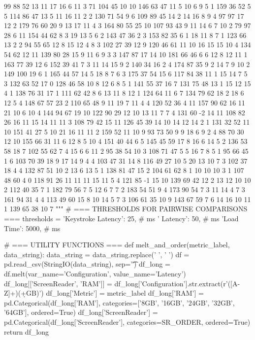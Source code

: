 \begin{pyverbatim}
{	99	88	52	13	11	17	16	6	11	3	71	104	45	10	10
	146	63	47	11	5	10	6	9	5	1	159	36	52	5	5
	114	86	47	13	5	11	16	11	2	2	130	71	54	9	6
	109	89	45	14	2	14	16	8	9	4	97	97	17	12	2
	179	76	60	20	9	13	17	11	4	3	164	80	55	25	10
	107	93	43	9	11	14	6	7	10	2	79	97	28	6	11
	154	44	62	8	3	19	13	5	6	2	143	47	36	2	3
	153	82	35	6	1	18	11	8	7	1	123	66	13	2	2
	94	55	65	12	8	15	12	4	8	3	102	27	39	12	9
	120	46	61	11	10	16	15	15	10	4	134	54	62	12	11
	139	80	28	15	9	11	6	9	3	3	147	87	17	14	10
	181	66	46	6	6	12	8	12	11	1	163	77	39	12	6
	152	39	41	7	3	11	14	15	9	2	140	34	16	2	4
	174	87	35	9	2	14	7	9	10	2	149	100	19	6	1
	165	44	57	14	5	18	8	7	6	3	175	37	54	15	6
	117	84	38	11	1	15	14	7	5	3	132	63	52	17	0
	128	46	58	10	8	12	6	8	5	1	141	55	37	16	7
	131	75	48	13	1	15	12	15	4	1	138	76	31	17	1
	111	62	42	8	6	13	11	8	12	1	124	64	11	6	7
	134	79	62	18	2	18	6	12	5	4	148	67	57	23	2
	110	65	48	9	11	19	7	11	4	4	120	52	36	4	11
	157	90	62	16	11	21	10	6	10	4	144	94	67	19	10
	122	90	29	12	10	13	11	7	7	4	131	60	-2	14	11
	108	82	26	16	11	15	14	11	11	3	108	79	42	15	11
	126	45	39	14	10	14	12	14	2	1	131	32	52	11	10
	151	41	27	5	10	21	16	11	11	2	159	52	11	10	9
	93	73	50	9	9	18	6	9	2	4	88	70	30	12	10
	155	66	31	11	6	12	8	5	10	4	151	40	44	6	5
	145	45	59	17	8	16	6	14	5	2	136	53	58	18	7
	102	55	62	7	4	15	6	6	11	2	95	38	54	10	3
	108	71	47	5	5	16	7	8	5	1	95	66	45	1	6
	103	70	39	18	9	17	14	9	4	4	103	47	31	14	8
	116	49	27	10	5	20	13	10	7	3	102	37	18	4	4
	132	87	51	10	2	13	6	13	5	1	138	81	47	15	2
	104	61	62	8	1	10	10	10	3	1	107	48	60	4	0
	118	91	26	11	11	11	15	11	5	4	121	85	-1	15	10
	139	69	42	12	2	13	12	10	10	2	112	40	35	7	1
	182	79	56	7	5	12	6	7	7	2	183	54	51	9	4
	173	90	54	7	3	11	14	4	7	3	161	94	31	4	4
	113	49	60	15	8	10	14	5	7	3	106	61	35	10	9
	143	67	59	7	6	14	16	10	11	1	139	65	38	10	7
	"""
	}
	# === THRESHOLDS FOR PAIRWISE COMPARISONS ===
	thresholds = {
	'Keystroke Latency': 25,  # ms
	' Latency': 50,  # ms
	'Load Time': 5000,  # ms
	}

	# === UTILITY FUNCTIONS ===
	def melt_and_order(metric_label, data_string):
	data_string = data_string.replace(' ', ' ')
	df = pd.read_csv(StringIO(data_string), sep='\t')
	df_long = df.melt(var_name='Configuration', value_name='Latency')
	df_long[['ScreenReader', 'RAM']] = df_long['Configuration'].str.extract(r'([A-Z]+)(\d+GB)')
	df_long['Metric'] = metric_label
	df_long['RAM'] = pd.Categorical(df_long['RAM'], categories=['8GB', '16GB', '24GB', '32GB', '64GB'], ordered=True)
	df_long['ScreenReader'] = pd.Categorical(df_long['ScreenReader'], categories=SR_ORDER, ordered=True)
	return df_long


\end{pyverbatim}
